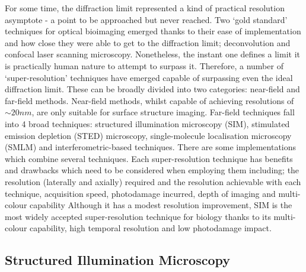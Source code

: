 For some time, the diffraction limit represented a kind of practical 
resolution asymptote - a point to be approached but never reached. Two
`gold standard' techniques for optical bioimaging emerged thanks to their
ease of implementation and how close they were able to get to the diffraction
limit; deconvolution\cite{agard1983three, wallace2001workingperson} and
confocal laser scanning microscopy\cite{sheppard1981theory,minsky1988memoir}. 
Nonetheless, the instant one defines a limit it is practically human nature 
to attempt to surpass it. Therefore, a number of `super-resolution' techniques
have emerged capable of surpassing even the ideal diffraction limit. These
can be broadly divided into two categories: near-field and far-field methods.
Near-field methods, whilst capable of achieving resolutions of $\sim 20 nm$,
are only suitable for surface structure imaging\cite{schermelleh2010guide}. 
Far-field techniques fall into 4 broad techniques: structured illumination
microscopy (SIM), stimulated emission depletion (STED) microscopy, 
single-molecule localisation microscopy (SMLM) and interferometric-based 
techniques. There are some implementations which combine several 
techniques. Each super-resolution technique has benefits and drawbacks which 
need to be considered when employing them including; the resolution 
(laterally and axially) required and the resolution achievable with each 
technique, acquisition speed, photodamage incurred, depth of imaging and 
multi-colour capability\cite{hell20152015,schermelleh2019super} Although it 
has a modest resolution improvement, SIM is the most widely accepted 
super-resolution technique for biology thanks to its multi-colour capability,
high temporal resolution and low photodamage impact\cite{leung2011review}.

\subsection{Structured Illumination Microscopy}
\label{subsec:SIM}

